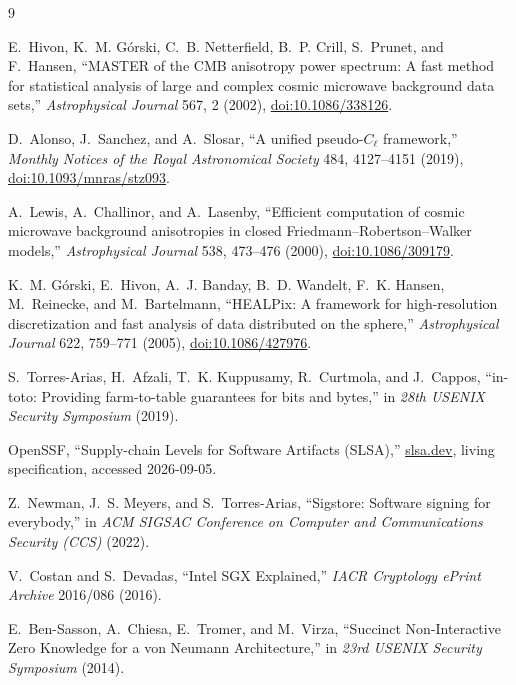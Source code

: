 \documentclass[11pt]{article}
\begin{document}
\footnotesize
\begin{thebibliography}{9}

E.~Hivon, K.~M. G\'orski, C.~B. Netterfield, B.~P. Crill, S.~Prunet, and
F.~Hansen, ``MASTER of the CMB anisotropy power spectrum:
A fast method for statistical analysis of large and complex cosmic microwave
background data sets,'' \emph{Astrophysical Journal} 567, 2 (2002),
\href{https://doi.org/10.1086/338126}{doi:10.1086/338126}.

D.~Alonso, J.~Sanchez, and A.~Slosar, ``A unified pseudo-\(C_\ell\) framework,''
\emph{Monthly Notices of the Royal Astronomical Society} 484, 4127--4151
(2019), \href{https://doi.org/10.1093/mnras/stz093}{doi:10.1093/mnras/stz093}.

A.~Lewis, A.~Challinor, and A.~Lasenby, ``Efficient computation of cosmic
microwave background anisotropies in closed Friedmann--Robertson--Walker
models,'' \emph{Astrophysical Journal} 538, 473--476 (2000),
\href{https://doi.org/10.1086/309179}{doi:10.1086/309179}.

K.~M. G\'orski, E.~Hivon, A.~J. Banday, B.~D. Wandelt, F.~K. Hansen,
M.~Reinecke, and M.~Bartelmann, ``HEALPix: A framework for high-resolution
discretization and fast analysis of data distributed on the sphere,''
\emph{Astrophysical Journal} 622, 759--771 (2005),
\href{https://doi.org/10.1086/427976}{doi:10.1086/427976}.

S.~Torres-Arias, H.~Afzali, T.~K. Kuppusamy, R.~Curtmola, and J.~Cappos,
``in-toto: Providing farm-to-table guarantees for bits and bytes,'' in
\emph{28th USENIX Security Symposium} (2019).

OpenSSF, ``Supply-chain Levels for Software Artifacts (SLSA),''
\href{https://slsa.dev}{slsa.dev}, living specification, accessed 2026-09-05.

Z.~Newman, J.~S. Meyers, and S.~Torres-Arias, ``Sigstore: Software signing
for everybody,'' in \emph{ACM SIGSAC Conference on Computer and
Communications Security (CCS)} (2022).

V.~Costan and S.~Devadas, ``Intel SGX Explained,'' \emph{IACR Cryptology
ePrint Archive} 2016/086 (2016).

E.~Ben-Sasson, A.~Chiesa, E.~Tromer, and M.~Virza, ``Succinct Non-Interactive
Zero Knowledge for a von Neumann Architecture,'' in \emph{23rd USENIX
Security Symposium} (2014).


\end{thebibliography}
\end{document}

